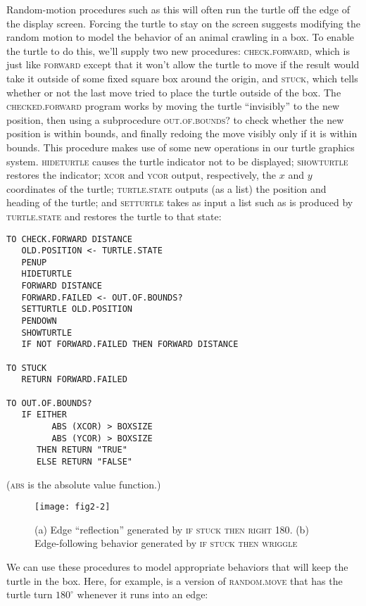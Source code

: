 \documentclass{book}
\begin{document}
Random-motion procedures such as this will often run the turtle off
the edge of the display screen. Forcing the turtle to stay on the screen
suggests modifying the random motion to model the behavior of an
animal crawling in a box. To enable the turtle to do this, we'll supply
two new procedures: \textsc{check.forward}, which is just like \textsc{forward} except
that it won't allow the turtle to move if the result would take it outside of
some fixed square box around the origin, and \textsc{stuck}, which tells whether
or not the last move tried to place the turtle outside of the box.
The \textsc{checked.forward} program works by moving the turtle ``invisibly''
to the new position, then using a subprocedure \textsc{out.of.bounds}? to check
whether the new position is within bounds, and finally redoing the move
visibly only if it is within bounds. This procedure makes use of some
new operations in our turtle graphics system. \textsc{hideturtle} causes the
turtle indicator not to be displayed; \textsc{showturtle} restores the indicator;
\textsc{xcor} and \textsc{ycor} output, respectively, the $x$ and $y$ coordinates of the
turtle; \textsc{turtle.state} outputs (as a list) the position and heading of
the turtle; and \textsc{setturtle} takes as input a list such as is produced by
\textsc{turtle.state} and restores the turtle to that state:

\begin{verbatim}
TO CHECK.FORWARD DISTANCE
   OLD.POSITION <- TURTLE.STATE
   PENUP
   HIDETURTLE
   FORWARD DISTANCE
   FORWARD.FAILED <- OUT.OF.BOUNDS?
   SETTURTLE OLD.POSITION
   PENDOWN
   SHOWTURTLE
   IF NOT FORWARD.FAILED THEN FORWARD DISTANCE

TO STUCK
   RETURN FORWARD.FAILED

TO OUT.OF.BOUNDS?
   IF EITHER
         ABS (XCOR) > BOXSIZE
         ABS (YCOR) > BOXSIZE
      THEN RETURN "TRUE"
      ELSE RETURN "FALSE"
\end{verbatim}(\textsc{abs} is the absolute value function.)

\begin{figure}
\begin{center}
\texttt{[image: fig2-2]}
\caption{(a) Edge ``reflection'' generated by \textsc{if}\textsc{ stuck}\textsc{ then} \textsc{right} \textsc{180}. (b) Edge-following behavior generated by \textsc{if}\textsc{ stuck}\textsc{ then}\textsc{ wriggle}}
\end{center}
\end{figure}

We can use these procedures to model appropriate behaviors that
will keep the turtle in the box. Here, for example, is a version of
\textsc{random.move} that has the turtle turn $180^{\circ}$ whenever it runs into an
edge:
\end{document}
